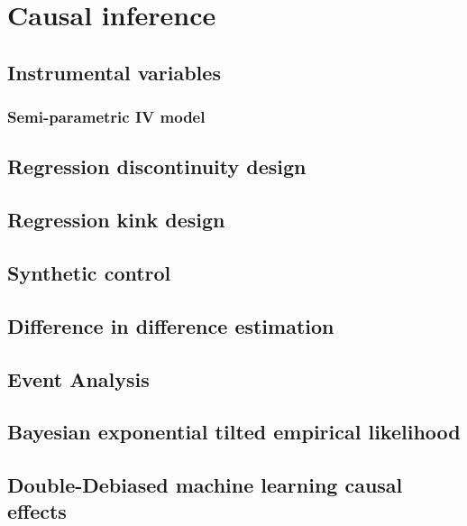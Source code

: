 \chapter{Causal inference}\label{chap12}

\section{Instrumental variables}\label{sec12_1}
\subsection{Semi-parametric IV model}\label{sec12_11}

\section{Regression discontinuity design}\label{sec12_2}

\section{Regression kink design}\label{sec12_3}

\section{Synthetic control}\label{sec12_4}

\section{Difference in difference estimation}\label{sec12_5}

\section{Event Analysis}\label{sec12_6}

\section{Bayesian exponential tilted empirical likelihood}\label{sec12_7}

\section{Double-Debiased machine learning causal effects}\label{sec12_8}
